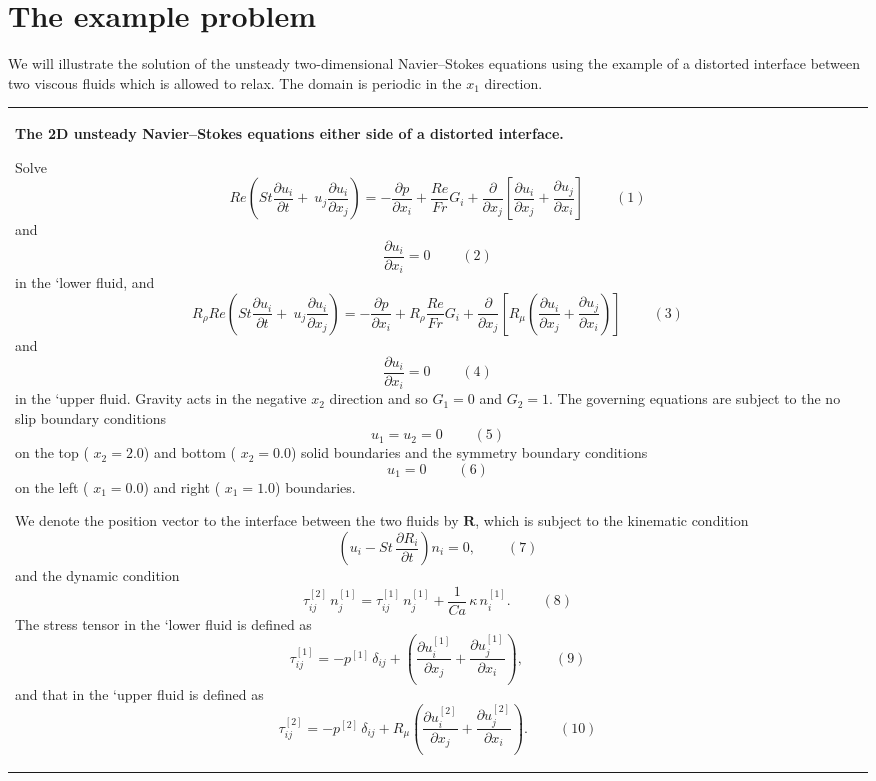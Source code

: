  

\hypertarget{index_example_problem}{}\section{The example problem}\label{index_example_problem}
We will illustrate the solution of the unsteady two-\/dimensional Navier--Stokes equations using the example of a distorted interface between two viscous fluids which is allowed to relax. The domain is periodic in the $ x_1 $ direction.

\begin{center} \tabulinesep=1mm
\begin{longtabu} spread 0pt [c]{*{1}{|X[-1]}|}
\hline
\begin{center} {\bfseries  The 2D unsteady Navier--Stokes equations either side of a distorted interface.} \end{center}  Solve \[ Re\left(St\frac{\partial u_i}{\partial t} + \ u_j\frac{\partial u_i}{\partial x_j}\right) = - \frac{\partial p}{\partial x_i} + \frac{Re}{Fr}G_i + \frac{\partial }{\partial x_j} \left[ \frac{\partial u_i}{\partial x_j} + \frac{\partial u_j}{\partial x_i} \right] \ \ \ \ \ \ \ \ \ \ (1) \] and \[ \frac{\partial u_i}{\partial x_i} = 0 \ \ \ \ \ \ \ \ \ \ (2) \] in the `lower\textquotesingle{} fluid, and \[ R_\rho Re\left(St\frac{\partial u_i}{\partial t} + \ u_j\frac{\partial u_i}{\partial x_j}\right) = - \frac{\partial p}{\partial x_i} + R_\rho \frac{Re}{Fr}G_i + \frac{\partial }{\partial x_j} \left[R_\mu \left( \frac{\partial u_i}{\partial x_j} + \frac{\partial u_j}{\partial x_i} \right) \right] \ \ \ \ \ \ \ \ \ \ (3) \] and \[ \frac{\partial u_i}{\partial x_i} = 0 \ \ \ \ \ \ \ \ \ \ (4) \] in the `upper\textquotesingle{} fluid. Gravity acts in the negative $ x_2 $ direction and so $ G_1 = 0 $ and $ G_2 = 1 $. The governing equations are subject to the no slip boundary conditions \[ u_1 = u_2 = 0 \ \ \ \ \ \ \ \ \ \ (5) \] on the top ( $ x_2 = 2.0 $) and bottom ( $ x_2 = 0.0 $) solid boundaries and the symmetry boundary conditions \[ u_1 = 0 \ \ \ \ \ \ \ \ \ \ (6) \] on the left ( $ x_1 = 0.0 $) and right ( $ x_1 = 1.0 $) boundaries.

We denote the position vector to the interface between the two fluids by $ \mathbf{R} $, which is subject to the kinematic condition \[ \left(u_i - St\, \frac{\partial R_i}{\partial t}\right) n_i = 0, \ \ \ \ \ \ \ \ \ \ (7) \] and the dynamic condition \[ \tau_{ij}^{[2]} \, n_j^{[1]} = \tau_{ij}^{[1]} \, n_j^{[1]} + \frac{1}{Ca} \, \kappa \, n_i^{[1]}. \ \ \ \ \ \ \ \ \ \ (8) \] The stress tensor in the `lower\textquotesingle{} fluid is defined as \[ \tau_{ij}^{[1]} = -p^{[1]} \, \delta_{ij} + \left(\frac{\partial u^{[1]}_i}{\partial x_j} + \frac{\partial u^{[1]}_j}{\partial x_i}\right), \ \ \ \ \ \ \ \ \ \ (9) \] and that in the `upper\textquotesingle{} fluid is defined as \[ \tau_{ij}^{[2]} = -p^{[2]} \, \delta_{ij} + R_\mu \left(\frac{\partial u^{[2]}_i}{\partial x_j} + \frac{\partial u^{[2]}_j}{\partial x_i}\right). \ \ \ \ \ \ \ \ \ \ (10) \]


\end{longtabu}
\end{center}
